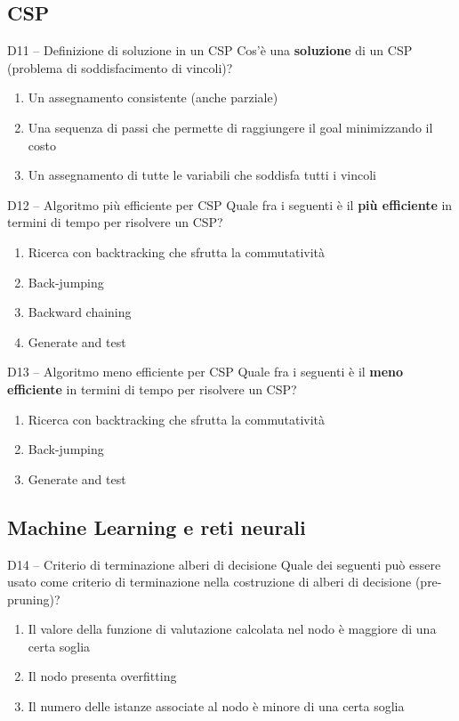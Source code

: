 \documentclass[12pt,a4paper]{article}
\begin{document}
\subsection{CSP}

\begin{domanda}{D11 -- Definizione di soluzione in un CSP}
Cos'è una \textbf{soluzione} di un CSP (problema di soddisfacimento di vincoli)?
\begin{enumerate}[label=\alph*.]
  \item Un assegnamento consistente (anche parziale)
  \item Una sequenza di passi che permette di raggiungere il goal minimizzando il costo
  \item Un assegnamento di tutte le variabili che soddisfa tutti i vincoli
\end{enumerate}
\end{domanda}

\begin{domanda}{D12 -- Algoritmo più efficiente per CSP}
Quale fra i seguenti è il \textbf{più efficiente} in termini di tempo per risolvere un CSP?
\begin{enumerate}[label=\alph*.]
  \item Ricerca con backtracking che sfrutta la commutatività
  \item Back-jumping
  \item Backward chaining
  \item Generate and test
\end{enumerate}
\end{domanda}

\begin{domanda}{D13 -- Algoritmo meno efficiente per CSP}
Quale fra i seguenti è il \textbf{meno efficiente} in termini di tempo per risolvere un CSP?
\begin{enumerate}[label=\alph*.]
  \item Ricerca con backtracking che sfrutta la commutatività
  \item Back-jumping
  \item Generate and test
\end{enumerate}
\end{domanda}

\subsection{Machine Learning e reti neurali}

\begin{domanda}{D14 -- Criterio di terminazione alberi di decisione}
Quale dei seguenti può essere usato come criterio di terminazione nella costruzione di alberi di decisione (pre-pruning)?
\begin{enumerate}[label=\alph*.]
  \item Il valore della funzione di valutazione calcolata nel nodo è maggiore di una certa soglia
  \item Il nodo presenta overfitting
  \item Il numero delle istanze associate al nodo è minore di una certa soglia
\end{enumerate}
\end{domanda}
\end{document}
